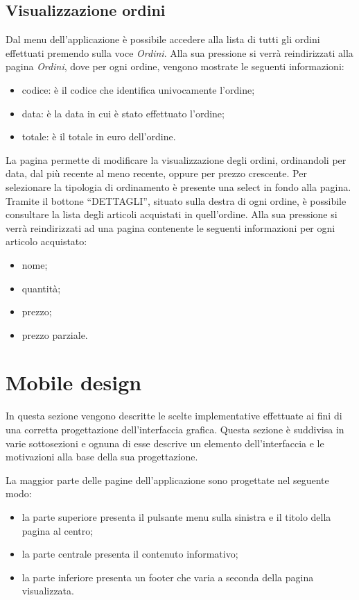 \documentclass[12pt, a4paper, titlepage]{report}
\begin{document}
	\subsection{Visualizzazione ordini}
	Dal menu dell'applicazione è possibile accedere alla lista di tutti gli ordini effettuati premendo sulla voce \textit{Ordini}. Alla sua pressione si verrà reindirizzati alla pagina \textit{Ordini}, dove per ogni ordine, vengono mostrate le seguenti informazioni:
	\begin{itemize}
		\item codice: è il codice che identifica univocamente l'ordine;
		\item data: è la data in cui è stato effettuato l'ordine;
		\item totale: è il totale in euro dell'ordine.
	\end{itemize} 
	La pagina permette di modificare la visualizzazione degli ordini, ordinandoli per data, dal più recente al meno recente, oppure per prezzo crescente. Per selezionare la tipologia di ordinamento è presente una select in fondo alla pagina.
	Tramite il bottone ``DETTAGLI'', situato sulla destra di ogni ordine, è possibile consultare la lista degli articoli acquistati in quell'ordine. Alla sua pressione si verrà reindirizzati ad una pagina contenente le seguenti informazioni per ogni articolo acquistato:
	\begin{itemize}
		\item nome;
		\item quantità;
		\item prezzo;
		\item prezzo parziale.
	\end{itemize}
	
	\section{Mobile design}
	
	In questa sezione vengono descritte le scelte implementative effettuate ai fini di una corretta progettazione dell'interfaccia grafica. Questa sezione è suddivisa in varie sottosezioni e ognuna di esse descrive un elemento dell'interfaccia e le motivazioni alla base della sua progettazione.
	\medskip
	
	\noindent La maggior parte delle pagine dell'applicazione sono progettate nel seguente modo:
	\begin{itemize}
		\item la parte superiore presenta il pulsante menu sulla sinistra e il titolo della pagina al centro;
		\item la parte centrale presenta il contenuto informativo;
		\item la parte inferiore presenta un footer che varia a seconda della pagina visualizzata.
	\end{itemize}
	
\end{document}
